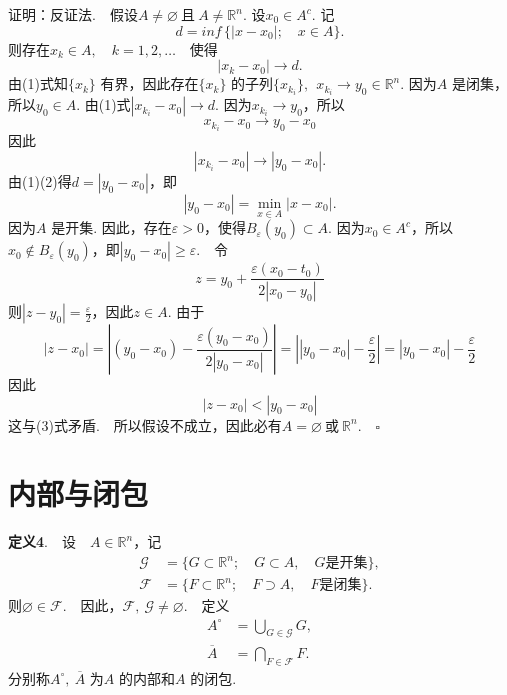 \documentclass{article}
\begin{document}
\noindent 证明：反证法.\ \ 假设\(A \neq \varnothing\ \text{且}\ A \neq \mathbb{R}^n\). 设\(x_0 \in A^{c}\). 记
\begin{equation*}
    d = inf \,\{ | x - x_0 |;\quad x \in A \}.
\end{equation*}
则存在\(x_k \in A,\quad k = 1,2,\dots \)\ \ 使得
\begin{equation}
    | x_k - x_0 |\to d.
\end{equation}
由(1)式知\(\{x_k\} \) 有界，因此存在\(\{x_k\} \) 的子列\(\{x_{k_{i}}\},\ \ x_{k_{i}} \to y_0 \in \mathbb{R}^n\). 因为\(A\) 是闭集，所以\(y_0 \in A\).\newline
由(1)式\(| x_{k_{i}} - x_0 |\to d \). 因为\(x_{k_{i}}\to y_0\)，所以
\begin{equation*}
    x_{k_{i}} - x_0 \to y_0 - x_0
\end{equation*}
因此
\begin{equation}
    | x_{k_{i}} - x_0 |\to | y_0 - x_0 |.
\end{equation}
由(1)(2)得\(d = | y_0 - x_0 | \)，即
\begin{equation}
    | y_0 - x_0 |= \min_{x \in A} | x - x_0 |.
\end{equation}
因为\(A\) 是开集. 因此，存在\(\varepsilon > 0\)，使得\(B_{\varepsilon }(y_0) \subset A\). 因为\(x_0 \in A^{c}\)，所以\(x_0 \notin B_{\varepsilon }(y_0)\)，即\(| y_0 - x_0| \ge \varepsilon\).\ \ 令
\begin{equation*}
    z = y_0 + \frac{\varepsilon (x_0 - t_0)}{2 | x_0 - y_0 | }
\end{equation*}
则\(| z - y_0 |= \frac{\varepsilon }{2}  \)，因此\(z \in A\). 由于
\begin{equation*}
    | z - x_0 |= \left| (y_0 - x_0) - \frac{\varepsilon(y_0 - x_0) }{2 | y_0 - x_0 | } \right|= \left| | y_0 - x_0 | - \frac{\varepsilon}{2}   \right|= | y_0 - x_0 | - \frac{\varepsilon }{2}
\end{equation*}
因此
\begin{equation*}
    | z - x_0 |< | y_0 - x_0 |
\end{equation*}
这与(3)式矛盾.\ \ 所以假设不成立，因此必有\(A = \varnothing\ \text{或}\ \mathbb{R}^n. \quad \square\)

\newpage

\section{内部与闭包}
\noindent \textbf{定义4}.\ \ 设\ \ \(A \in \mathbb{R}^n\)，记
\begin{align*}
    \mathcal{G} &= \{G \subset \mathbb{R}^n; \quad G \subset A,\quad G\text{是开集}\}, \\
    \mathcal{F} &= \{F \subset \mathbb{R}^n;\quad F \supset A,\quad F\text{是闭集}\}.
\end{align*}
则\(\varnothing \in \mathcal{F}\).\ \ 因此，\(\mathcal{F},\ \mathcal{G} \neq \varnothing \).\ \ 定义
\begin{align*}
    A^{ \circ } &= \bigcup_{G \in \mathcal{G}}G, \\
    \overline{A} &= \bigcap_{F \in \mathcal{F}}F.
\end{align*}
分别称\(A^{ \circ },\ \overline{A}\) 为\(A\) 的内部和\(A\) 的闭包.
\end{document}
